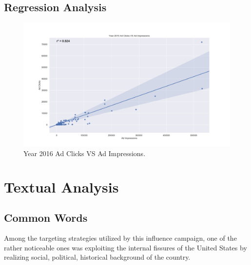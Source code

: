 \documentclass[12pt]{article}
\theoremstyle{definition}
\begin{document}
\subsection*{\centering Regression Analysis}

\begin{figure}[H]
\centering
\includegraphics[width=\columnwidth]{./image/regression-plots/ad-clicks-vs-ad-impressions/year-2015-ad-clicks-vs-ad-impressions.png}
\caption*{Year 2016 Ad Clicks VS Ad Impressions.}
\end{figure}


\section*{\centering Textual Analysis}


\subsection*{\centering Common Words}

Among the targeting strategies utilized by this influence campaign, one of the
rather noticeable ones was exploiting the internal fissures of the United States
by realizing social, political, historical background of the country.
\end{document}
